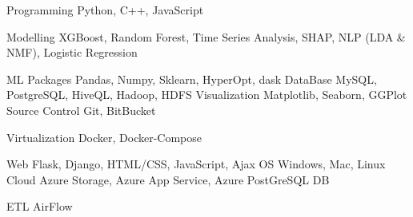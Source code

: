

\begin{cvskills}

  \cvskill
    {Programming} %
    {Python, C++, JavaScript} %
    
  \cvskill
  {Modelling} %
    {XGBoost, Random Forest, Time Series Analysis, SHAP, NLP (LDA \& NMF), Logistic Regression}

  \cvskill
    {ML Packages} %
    {Pandas, Numpy, Sklearn, HyperOpt, dask} %
  \cvskill
    {DataBase} %
    {MySQL, PostgreSQL, HiveQL, Hadoop, HDFS} %
  \cvskill
    {Visualization} %
    {Matplotlib, Seaborn, GGPlot} %
  \cvskill
    {Source Control} %
    {Git, BitBucket}
    
  \cvskill
    {Virtualization}
    {Docker, Docker-Compose}%
    
  \cvskill
    {Web}
    {Flask, Django, HTML/CSS, JavaScript, Ajax}%
  \cvskill
    {OS}
    {Windows, Mac, Linux}%
  \cvskill
    {Cloud}
    {Azure Storage, Azure App Service, Azure PostGreSQL DB}
    
    \cvskill
    {ETL}
    {AirFlow}
\end{cvskills}

